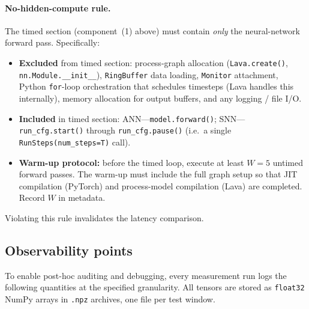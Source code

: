 \documentclass[11pt,a4paper]{article}
\begin{document}
\paragraph{No-hidden-compute rule.}
The timed section (component~(1) above) must contain \emph{only} the
neural-network forward pass.  Specifically:
\begin{itemize}[nosep]
\item \textbf{Excluded} from timed section: process-graph allocation
  (\texttt{Lava.create()}, \texttt{nn.Module.\_\_init\_\_}),
  \texttt{RingBuffer} data loading, \texttt{Monitor} attachment,
  Python \texttt{for}-loop orchestration that schedules timesteps
  (Lava handles this internally), memory allocation for output buffers,
  and any logging / file I/O.
\item \textbf{Included} in timed section: ANN---\texttt{model.forward()};
  SNN---\texttt{run\_cfg.start()} through \texttt{run\_cfg.pause()}
  (i.e.\ a single \texttt{RunSteps(num\_steps=T)} call).
\item \textbf{Warm-up protocol:} before the timed loop, execute at least
  $W = 5$ untimed forward passes.  The warm-up must include the full
  graph setup so that JIT compilation (PyTorch) and process-model
  compilation (Lava) are completed.  Record $W$ in metadata.
\end{itemize}
Violating this rule invalidates the latency comparison.

\subsection{Observability points}\label{sec:observability}

To enable post-hoc auditing and debugging, every measurement run logs the
following quantities at the specified granularity.  All tensors are stored
as \texttt{float32} NumPy arrays in \texttt{.npz} archives, one file per
test window.
\end{document}
